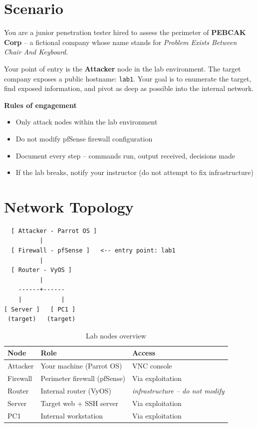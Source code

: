\documentclass[a4paper, 12pt]{article}
\begin{document}
\section{Scenario}

You are a junior penetration tester hired to assess the perimeter of
\textbf{PEBCAK Corp} -- a fictional company whose name stands for
\textit{Problem Exists Between Chair And Keyboard}.

Your point of entry is the \textbf{Attacker} node in the lab environment.
The target company exposes a public hostname: \texttt{lab1}.
Your goal is to enumerate the target, find exposed information, and pivot
as deep as possible into the internal network.

\begin{mdframed}[backgroundcolor=labgray, linecolor=labred, linewidth=1pt]
\textbf{Rules of engagement}
\begin{itemize}[leftmargin=1.5em, topsep=2pt]
  \item Only attack nodes within the lab environment
  \item Do not modify pfSense firewall configuration
  \item Document every step -- commands run, output received, decisions made
  \item If the lab breaks, notify your instructor (do not attempt to fix infrastructure)
\end{itemize}
\end{mdframed}

\section{Network Topology}

\begin{verbatim}
  [ Attacker - Parrot OS ]
          |
  [ Firewall - pfSense ]   <-- entry point: lab1
          |
  [ Router - VyOS ]
          |
    ------+------
    |           |
[ Server ]   [ PC1 ]
 (target)   (target)
\end{verbatim}

\begin{table}[H]
\centering
\begin{tabularx}{0.85\textwidth}{lXl}
\toprule
\textbf{Node} & \textbf{Role} & \textbf{Access} \\
\midrule
Attacker & Your machine (Parrot OS)       & VNC console \\
Firewall & Perimeter firewall (pfSense)   & Via exploitation \\
Router   & Internal router (VyOS)         & \textit{infrastructure -- do not modify} \\
Server   & Target web + SSH server        & Via exploitation \\
PC1      & Internal workstation           & Via exploitation \\
\bottomrule
\end{tabularx}
\caption{Lab nodes overview}
\end{table}
\end{document}
